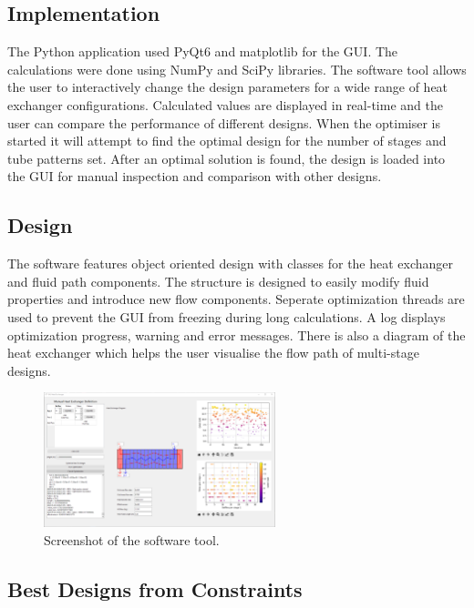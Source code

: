 \documentclass{article}
\begin{document}
\subsection{Implementation}

The Python application used PyQt6 and matplotlib for the GUI. The calculations were done using NumPy and SciPy libraries.
The software tool allows the user to interactively change the design parameters for a wide range of heat exchanger configurations.
Calculated values are displayed in real-time and the user can compare the performance of different designs.
When the optimiser is started it will attempt to find the optimal design for the number of stages and tube patterns set.
After an optimal solution is found, the design is loaded into the GUI for manual inspection and comparison with other designs.

\subsection{Design}
The software features object oriented design with classes for the heat exchanger and fluid path components.
The structure is designed to easily modify fluid properties and introduce new flow components.
Seperate optimization threads are used to prevent the GUI from freezing during long calculations.
A log displays optimization progress, warning and error messages. There is also a diagram of the heat exchanger which helps
the user visualise the flow path of multi-stage designs.

\begin{figure}[H]
  \centering
  \includegraphics[width=0.6\textwidth]{software.png}
  \caption{Screenshot of the software tool.}
  \label{fig:software}
\end{figure}

\subsection{Best Designs from Constraints}
\end{document}
